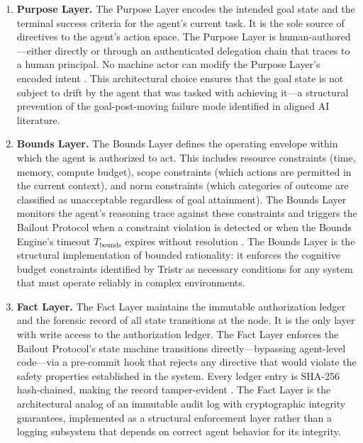 \begin{enumerate}
    \item \textbf{Purpose Layer.} The Purpose Layer encodes the intended goal state and the terminal success criteria for the agent's current task. It is the sole source of directives to the agent's action space. The Purpose Layer is human-authored---either directly or through an authenticated delegation chain that traces to a human principal. No machine actor can modify the Purpose Layer's encoded intent \cite{bx3framework2026}. This architectural choice ensures that the goal state is not subject to drift by the agent that was tasked with achieving it---a structural prevention of the goal-post-moving failure mode identified in aligned AI literature.

    \item \textbf{Bounds Layer.} The Bounds Layer defines the operating envelope within which the agent is authorized to act. This includes resource constraints (time, memory, compute budget), scope constraints (which actions are permitted in the current context), and norm constraints (which categories of outcome are classified as unacceptable regardless of goal attainment). The Bounds Layer monitors the agent's reasoning trace against these constraints and triggers the Bailout Protocol when a constraint violation is detected or when the Bounds Engine's timeout $T_{\text{bounds}}$ expires without resolution \cite{bx3framework2026}. The Bounds Layer is the structural implementation of bounded rationality: it enforces the cognitive budget constraints identified by Tristr \cite{tristr81} as necessary conditions for any system that must operate reliably in complex environments.

    \item \textbf{Fact Layer.} The Fact Layer maintains the immutable authorization ledger and the forensic record of all state transitions at the node. It is the only layer with write access to the authorization ledger. The Fact Layer enforces the Bailout Protocol's state machine transitions directly---bypassing agent-level code---via a pre-commit hook that rejects any directive that would violate the safety properties established in the system. Every ledger entry is SHA-256 hash-chained, making the record tamper-evident \cite{bx3framework2026}. The Fact Layer is the architectural analog of an immutable audit log with cryptographic integrity guarantees, implemented as a structural enforcement layer rather than a logging subsystem that depends on correct agent behavior for its integrity.
\end{enumerate}

